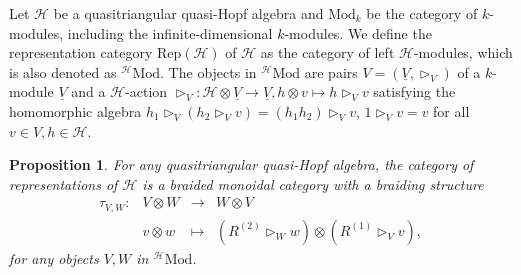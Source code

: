 \documentclass[reqno]{amsart}
\newtheorem{proposition}[formula]{Proposition}
\theoremstyle{definition}
\theoremstyle{remark}
\begin{document}
Let $\mathscr{H}$ be a quasitriangular quasi-Hopf algebra and $\text{Mod}_k$ be the category of $k$-modules, including the infinite-dimensional $k$-modules. We define the representation category $\text{Rep}(\mathscr{H})$ of $\mathscr{H}$ as the category of left $\mathscr{H}$-modules, which is also denoted as $^{\mathscr{H}}\text{Mod}$. The objects in $^{\mathscr{H}}\text{Mod}$ are pairs $V=\left(\underline{V}, { \triangleright _V}\right)$ of a $k$-module $\underline{V}$ and a $\mathscr{H}$-action ${ \triangleright _V}:\mathscr{H}\otimes \underline{V}\longrightarrow \underline{V}, h \otimes v \longmapsto h{ \triangleright _V} v$ satisfying the homomorphic algebra $h_1 { \triangleright _V}\left(h_2{ \triangleright _V}v\right) = (h_1h_2){ \triangleright _V}v$, $1{ \triangleright _V}v = v$ for all $v \in V,h\in\mathscr{H}$.

\begin{proposition}
    For any quasitriangular quasi-Hopf algebra, the category of representations of $\mathscr{H}$ is a braided monoidal category with a braiding structure
\begin{equation}\label{braiding structure}
\begin{array}{rccc}
\tau_{V,W}: & V\otimes W & \longrightarrow & W\otimes V \\
   & v\otimes w & \longmapsto  & \left(R^{(2)}\triangleright_W w\right)\otimes \left(R^{(1)}\triangleright_V v\right),
\end{array}
\end{equation}
for any objects $V,W$ in $^{\mathscr{H}}\text{Mod}$.
\end{proposition}
\end{document}
